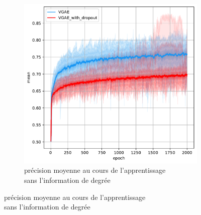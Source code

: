 \documentclass{article}
\begin{document}
\begin{figure}[H]
\begin{subfigure}{0.45\textwidth}
      \includegraphics[width=\textwidth]{graphics/APs_no_degree_dropout_cinf.svg.pdf}
      \centering
      \caption{précision moyenne au cours de l'apprentissage\\ sans l'information de degrée}
    \end{subfigure}
    

\end{figure}
\end{document}
